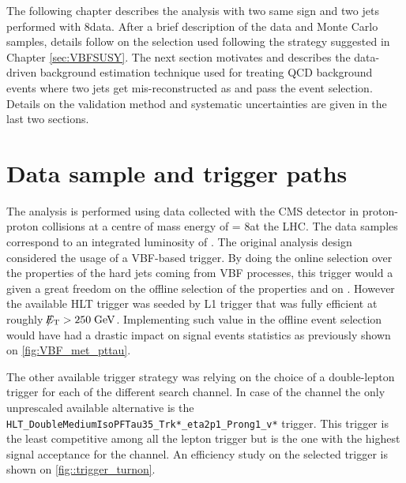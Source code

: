 
The following chapter describes the analysis with two same sign \hadtau and two jets performed with 8\tev data. After a brief description of the data and Monte Carlo samples, details follow on the selection used following the strategy suggested in Chapter \ref{sec:VBFSUSY}. The next section motivates and describes the data-driven background estimation technique used for treating QCD background events where two jets get mis-reconstructed as \hadtau and pass the event selection. Details on the validation method and systematic uncertainties are given in the last two sections.

\section {Data sample and trigger paths}
\FloatBarrier

The analysis is performed using data collected with the CMS detector
in proton-proton collisions at a centre of mass energy of \CM = 8\tev at the LHC. The data samples correspond to an integrated luminosity of \lumiOld. 
The original analysis design considered the usage of a VBF-based trigger. By doing the online selection over the properties of the hard jets coming from VBF processes, this trigger would a given a great freedom on the offline selection of the \hadtau properties and on \met. However the available HLT trigger was seeded by \met L1 trigger that was fully efficient at roughly $\slash\mkern-12mu{E}_{\text{T}} > 250\;\text{Ge}\kern-0.06667em\text{V}$. Implementing such value in the offline event selection would have had a drastic impact on signal events statistics as previously shown on \autoref{fig:VBF_met_pttau}.

The other available trigger strategy was relying on the choice of a double-lepton trigger for each of the different search channel. In case of the \hadtau\hadtau channel the only unprescaled available alternative is the \texttt{HLT\_\-DoubleMedium\-IsoPFTau35\_\-Trk*\_\-eta2p1\_\-Prong1\_\-v*} trigger. This trigger is the least competitive among all the lepton trigger but is the one with the highest signal acceptance for the \hadtau channel. An efficiency study on the selected trigger is shown on \autoref{fig::trigger_turnon}.

